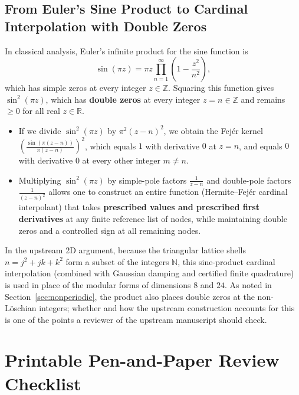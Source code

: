 \documentclass[11pt, a4paper]{article}
\theoremstyle{definition}
\theoremstyle{remark}
\newcommand{\R}{\mathbb{R}}
\newcommand{\Z}{\mathbb{Z}}
\newcommand{\N}{\mathbb{N}}
\begin{document}
\subsection{From Euler's Sine Product to Cardinal Interpolation with Double Zeros}
In classical analysis, Euler's infinite product for the sine function is
\[
\sin(\pi z) = \pi z \prod_{n=1}^\infty \left(1 - \frac{z^2}{n^2}\right),
\]
which has simple zeros at every integer $z \in \Z$. Squaring this function gives $\sin^2(\pi z)$, which has \textbf{double zeros} at every integer $z = n \in \Z$ and remains $\ge 0$ for all real $z \in \R$.
\begin{itemize}
    \item If we divide $\sin^2(\pi z)$ by $\pi^2 (z - n)^2$, we obtain the Fej\'er kernel $\left(\frac{\sin(\pi(z - n))}{\pi(z - n)}\right)^2$, which equals $1$ with derivative $0$ at $z = n$, and equals $0$ with derivative $0$ at every other integer $m \neq n$.
    \item Multiplying $\sin^2(\pi z)$ by simple-pole factors $\frac{1}{z - n}$ and double-pole factors $\frac{1}{(z - n)^2}$ allows one to construct an entire function (Hermite--Fej\'er cardinal interpolant) that takes \textbf{prescribed values and prescribed first derivatives} at any finite reference list of nodes, while maintaining double zeros and a controlled sign at all remaining nodes.
\end{itemize}
In the upstream 2D argument, because the triangular lattice shells $n = j^2 + j k + k^2$ form a subset of the integers $\N$, this sine-product cardinal interpolation (combined with Gaussian damping and certified finite quadrature) is used in place of the modular forms of dimensions $8$ and $24$. As noted in Section~\ref{sec:nonperiodic}, the product also places double zeros at the non-L\"oschian integers; whether and how the upstream construction accounts for this is one of the points a reviewer of the upstream manuscript should check.

\section{Printable Pen-and-Paper Review Checklist}
\end{document}
